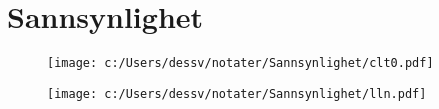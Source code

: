 \chapter{Sannsynlighet} 
\begin{figure} 
\texttt{[image: c:/Users/dessv/notater/Sannsynlighet/clt0.pdf]} 
\end{figure} 
\begin{figure} 
\texttt{[image: c:/Users/dessv/notater/Sannsynlighet/lln.pdf]} 
\end{figure} 
